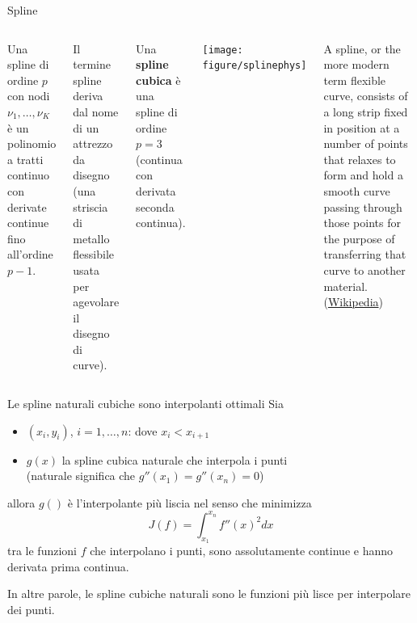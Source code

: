 \documentclass{beamer}\usepackage[]{graphicx}\usepackage[]{color}
\newcommand{\spazio}{\noindent\makebox[\linewidth]{\resizebox{0.1\linewidth}{1pt}{{$\bullet$}}}}
\begin{document}
\begin{frame}{Spline}

\begin{columns}

Una spline di ordine $p$ con nodi $\nu_1,\ldots,\nu_K$ \`e un polinomio a tratti continuo con derivate continue fino all'ordine $p-1$.

\spazio

Il termine spline deriva dal nome di un attrezzo da disegno (una striscia di metallo flessibile usata per agevolare il disegno di curve).

\spazio

Una {\bf spline cubica} \`e una spline di ordine $p=3$ (continua con derivata seconda continua).




{\centering \texttt{[image: figure/splinephys]}


}

\begin{scriptsize}
A spline, or the more modern term flexible curve, consists of a long strip fixed in position at a number of points that relaxes to form and hold a smooth curve passing through those points for the purpose of transferring that curve to another material. (\href{https://en.wikipedia.org/wiki/Flat_spline}{Wikipedia})\par
\end{scriptsize}
\end{columns}
\end{frame}


\begin{frame}{Le spline naturali cubiche sono interpolanti ottimali}
Sia
\begin{itemize}
\item $(x_i,y_i)$, $i=1,\ldots,n$: dove $x_i<x_{i+1}$ 
\item $g(x)$ la spline cubica naturale che interpola i punti \\ (naturale significa che $g''(x_1)=g''(x_n)=0$)
\end{itemize}
allora $g()$ \`e l'interpolante pi\`u liscia nel senso che minimizza
\[ J(f) = \int_{x_1}^{x_n} f''(x)^2dx \]
tra le funzioni $f$ che interpolano i punti, sono assolutamente continue e hanno derivata prima continua.

\spazio

In altre parole, le spline cubiche naturali sono le funzioni pi\`u lisce per interpolare dei punti.
\end{frame}
\end{document}
